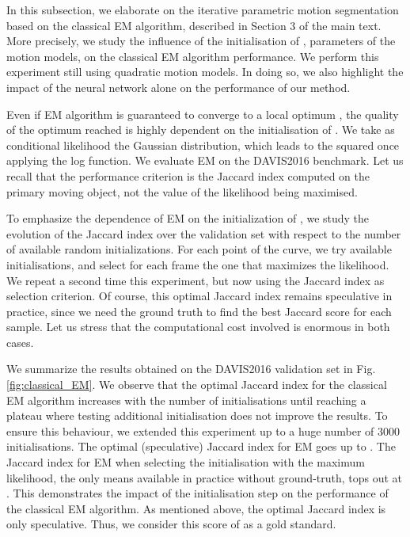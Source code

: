 \documentclass[10pt,twocolumn,letterpaper]{article}
\begin{document}
In this subsection, we elaborate on the iterative parametric motion segmentation based on the classical EM algorithm, described in Section 3 of the main text. More precisely, we study the influence of the initialisation of , parameters of the motion models, on the classical EM algorithm performance. We perform this experiment still using quadratic motion models. In doing so, we also highlight the impact of the neural network alone on the performance of our method.




Even if EM algorithm is guaranteed to converge to a local optimum \cite{murphy_book2012}, the quality of the optimum reached is highly dependent on the initialisation of . We take as conditional likelihood  the Gaussian distribution, which leads to the squared  once applying the log function. We evaluate EM on the DAVIS2016 benchmark. Let us recall that the performance criterion is the Jaccard index computed on the primary moving object, not the value of the likelihood being maximised.

To emphasize the dependence of EM on the initialization of , we study the evolution of the Jaccard index over the validation set with respect to the number of available random initializations. For each point of the curve, we try available initialisations, and select for each frame the one that maximizes the likelihood. We repeat a second time this experiment, but now using the Jaccard index as selection criterion. Of course, this optimal Jaccard index remains speculative in practice, since we need the ground truth to find the best Jaccard score for each sample. Let us stress that the computational cost involved is enormous in both cases.

We summarize the results obtained on the DAVIS2016 validation set in Fig.\ref{fig:classical_EM}. We observe that the optimal Jaccard index for the classical EM algorithm increases with the number of initialisations until reaching a plateau where testing additional initialisation does not improve the results. To ensure this behaviour, we extended this experiment up to a huge number of 3000 initialisations. 
The optimal (speculative) Jaccard index for EM goes up to . The Jaccard index for EM when selecting the initialisation with the maximum likelihood, the only means available in practice without ground-truth, tops out at  .
This demonstrates the impact of the initialisation step on the performance of the classical EM algorithm. As mentioned above, the optimal Jaccard index is only speculative. Thus, we consider this score of  as a gold standard.
\end{document}
